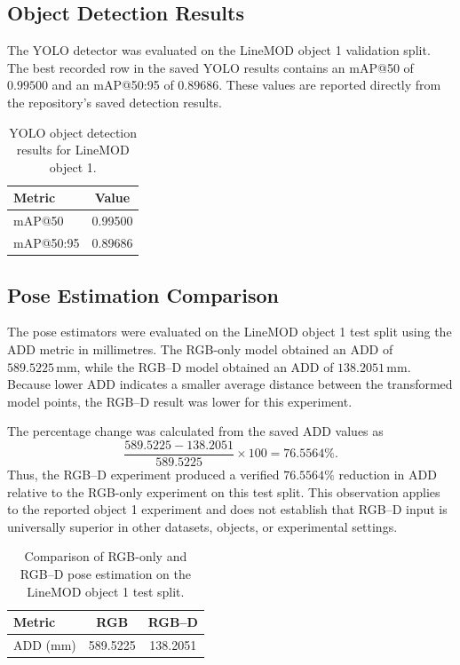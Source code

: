 \subsection{Object Detection Results}

The YOLO detector was evaluated on the LineMOD object 1 validation split. The best recorded row in the saved YOLO results contains an mAP@50 of $0.99500$ and an mAP@50:95 of $0.89686$. These values are reported directly from the repository's saved detection results.

\begin{table}[htbp]
    \centering
    \caption{YOLO object detection results for LineMOD object 1.}
    \label{tab:yolo-results}
    \begin{tabular}{lc}
        \hline
        Metric & Value \\
        \hline
        mAP@50 & 0.99500 \\
        mAP@50:95 & 0.89686 \\
        \hline
    \end{tabular}
\end{table}

\subsection{Pose Estimation Comparison}

The pose estimators were evaluated on the LineMOD object 1 test split using the ADD metric in millimetres. The RGB-only model obtained an ADD of $589.5225\,\mathrm{mm}$, while the RGB--D model obtained an ADD of $138.2051\,\mathrm{mm}$. Because lower ADD indicates a smaller average distance between the transformed model points, the RGB--D result was lower for this experiment.

The percentage change was calculated from the saved ADD values as
\[
\frac{589.5225 - 138.2051}{589.5225} \times 100 = 76.5564\%.
\]
Thus, the RGB--D experiment produced a verified $76.5564\%$ reduction in ADD relative to the RGB-only experiment on this test split. This observation applies to the reported object 1 experiment and does not establish that RGB--D input is universally superior in other datasets, objects, or experimental settings.

\begin{table}[htbp]
    \centering
    \caption{Comparison of RGB-only and RGB--D pose estimation on the LineMOD object 1 test split.}
    \label{tab:pose-results}
    \begin{tabular}{lcc}
        \hline
        Metric & RGB & RGB--D \\
        \hline
        ADD (mm) & 589.5225 & 138.2051 \\
        \hline
    \end{tabular}
\end{table}


